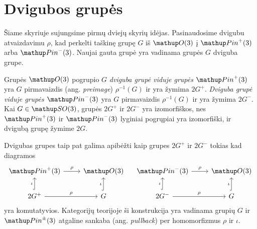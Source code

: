 
\section{Dvigubos grupės}

Šiame skyriuje sujungsime pirmų dviejų skyrių idėjas.
Pasinaudosime dvigubu atvaizdavimu $\rho$,
kad perkelti taškinę grupę $G$ iš $\Orth3$ į $\pinp$ arba $\pinm$.
Naujai gauta grupė yra vadinama grupės $G$ dviguba grupe.
\begin{definition}
	Grupės $\Orth3$ pogrupio $G$ \emph{dviguba grupė viduje grupės $\pinp$} yra
	$G$ pirmavaizdis (ang. \emph{preimage}) $\rho^{-1}(G)$ ir yra žymima $2G^+$.
	\emph{Dviguba grupė viduje grupės $\pinm$} yra
	$G$ pirmavaizdis $\rho^{-1}(G)$ ir yra žymima $2G^-$.
	Kai $G \in \SO3$, grupės $2G^+$ ir $2G^-$ yra izomorfiškos,
	nes $\pinp$ ir $\pinm$ lyginiai pogrųpiai yra izomorfiški,
	ir dvigubą grupę žymime $2G$.
\end{definition}
\begin{remark}
	Dvigubas grupes taip pat galima apibėžti
	kaip grupes $2G^+$ ir $2G^-$ tokias kad diagramos
	\begin{equation}
		\begin{tikzcd}
			\pinp \arrow[r, "\rho"] & \Orth3 \\
			2G^+ \arrow[u, "\iota", hook] \arrow[r, "\rho"] & G \arrow[u, "\iota", hook]
		\end{tikzcd}
		\quad
		\begin{tikzcd}
			\pinm \arrow[r, "\rho"] & \Orth3 \\
			2G^- \arrow[u, "\iota", hook] \arrow[r, "\rho"] & G \arrow[u, "\iota", hook]
		\end{tikzcd}
	\end{equation}
	yra komutatyvios.
	Kategorijų teorijoje ši konstrukcija yra vadinama
	grupių $G$ ir $\pinpm$ atgaline sankaba (ang. \emph{pullback})
	per homomorfizmus $\rho$ ir $\iota$.
\end{remark}

